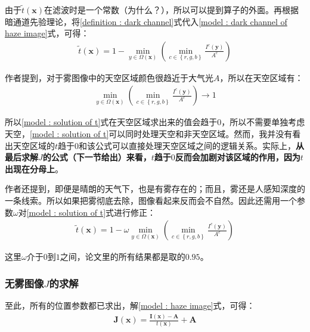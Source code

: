 \documentclass[UTF8]{ctexart}
\begin{document}
                \indent 由于$\widetilde{t}\left( \mathbf{x} \right)$在滤波时是一个常数（为什么？），所以可以提到算子的外面。再根据暗通道先验理论，将\ref{definition : dark channel}式代入\ref{model : dark channel of haze image}式，可得：
                    \begin{align}
                        \widetilde{t}\left( \mathbf{x} \right) = 1 -  \mathop{min}\limits_{ y \in \Omega \left( \mathbf{x} \right)} \left( \mathop{min}\limits_{c \in \left\{ r, g, b \right\}  }  \frac{ I^c \left( \mathbf{y} \right) }{A^c} \right) \label{model : solution of t}
                    \end{align}
                    
                \indent 作者提到，对于雾图像中的天空区域颜色很趋近于大气光$A$，所以在天空区域有：
                    \begin{align}
                        \mathop{min}\limits_{ y \in \Omega \left( \mathbf{x} \right)} \left( \mathop{min}\limits_{c \in \left\{ r, g, b \right\}  }  \frac{ I^c \left( \mathbf{y} \right) }{A^c} \right) \rightarrow 1 \label{model : sky region}
                    \end{align}
                    
                \indent 所以\ref{model : solution of t}式在天空区域求出来的值会趋于$0$，所以不需要单独考虑天空，\ref{model : solution of t}可以同时处理天空和非天空区域。然而，我并没有看出天空区域的$t$趋于$0$和该公式可以直接处理天空区域之间的逻辑关系。实际上，\textbf{从最后求解$J$的公式（下一节给出）来看，$t$趋于$0$反而会加剧对该区域的作用，因为$t$出现在分母上}。
                
                \indent 作者还提到，即便是晴朗的天气下，也是有雾存在的；而且，雾还是人感知深度的一条线索。所以如果把雾彻底去除，图像看起来反而会不自然。因此还需用一个参数$\omega$对\ref{model : solution of t}式进行修正：
                    \begin{align}
                        \widetilde{t}\left( \mathbf{x} \right) = 1 -  \omega \mathop{min}\limits_{ y \in \Omega \left( \mathbf{x} \right)} \left( \mathop{min}\limits_{c \in \left\{ r, g, b \right\}  }  \frac{ I^c \left( \mathbf{y} \right) }{A^c} \right) \label{model : final solution of t}
                    \end{align}
                    
                \indent 这里$\omega$介于$0$到$1$之间，论文里的所有结果都是取的$0.95$。
                
            \subsubsection*{无雾图像$J$的求解}
                \indent 至此，所有的位置参数都已求出，解\ref{model : haze image}式，可得：
                    \begin{align}
                        \mathbf{J}\left( \mathbf{x} \right) = \frac{ \mathbf{I}\left( \mathbf{x} \right) - \mathbf{A} }{ t\left( \mathbf{x} \right) } + \mathbf{A} \label{model : solution of J}
                    \end{align}
                    
\end{document}
